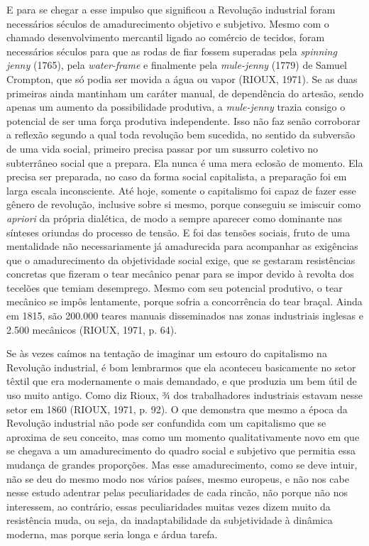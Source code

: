 E para se chegar a esse impulso que significou a Revolução industrial
foram necessários séculos de amadurecimento objetivo e subjetivo. Mesmo
com o chamado desenvolvimento mercantil ligado ao comércio de tecidos,
foram necessários séculos para que as rodas de fiar fossem superadas
pela \emph{spinning jenny} (1765), pela \emph{water-frame} e finalmente
pela \emph{mule-jenny} (1779) de Samuel Crompton, que só podia ser
movida a água ou vapor (RIOUX, 1971). Se as duas primeiras ainda
mantinham um caráter manual, de dependência do artesão, sendo apenas um
aumento da possibilidade produtiva, a \emph{mule-jenny} trazia consigo o
potencial de ser uma força produtiva independente. Isso não faz senão
corroborar a reflexão segundo a qual toda revolução bem sucedida, no
sentido da subversão de uma vida social, primeiro precisa passar por um
sussurro coletivo no subterrâneo social que a prepara. Ela nunca é uma
mera eclosão de momento. Ela precisa ser preparada, no caso da forma
social capitalista, a preparação foi em larga escala inconsciente. Até
hoje, somente o capitalismo foi capaz de fazer esse gênero de revolução,
inclusive sobre si mesmo, porque conseguiu se imiscuir como
\emph{apriori} da própria dialética, de modo a sempre aparecer como
dominante nas sínteses oriundas do processo de tensão. E foi das tensões
sociais, fruto de uma mentalidade não necessariamente já amadurecida
para acompanhar as exigências que o amadurecimento da objetividade
social exige, que se gestaram resistências concretas que fizeram o tear
mecânico penar para se impor devido à revolta dos tecelões que temiam
desemprego. Mesmo com seu potencial produtivo, o tear mecânico se impôs
lentamente, porque sofria a concorrência do tear braçal. Ainda em 1815,
são 200.000 teares manuais disseminados nas zonas industriais inglesas e
2.500 mecânicos (RIOUX, 1971, p. 64).

Se às vezes caímos na tentação de imaginar um estouro do capitalismo na
Revolução industrial, é bom lembrarmos que ela aconteceu basicamente no
setor têxtil que era modernamente o mais demandado, e que produzia um
bem útil de uso muito antigo. Como diz Rioux, ¾ dos trabalhadores
industriais estavam nesse setor em 1860 (RIOUX, 1971, p. 92). O que
demonstra que mesmo a época da Revolução industrial não pode ser
confundida com um capitalismo que se aproxima de seu conceito, mas como
um momento qualitativamente novo em que se chegava a um amadurecimento
do quadro social e subjetivo que permitia essa mudança de grandes
proporções. Mas esse amadurecimento, como se deve intuir, não se deu do
mesmo modo nos vários países, mesmo europeus, e não nos cabe nesse
estudo adentrar pelas peculiaridades de cada rincão, não porque não nos
interessem, ao contrário, essas peculiaridades muitas vezes dizem muito
da resistência muda, ou seja, da inadaptabilidade da subjetividade à
dinâmica moderna, mas porque seria longa e árdua tarefa.

